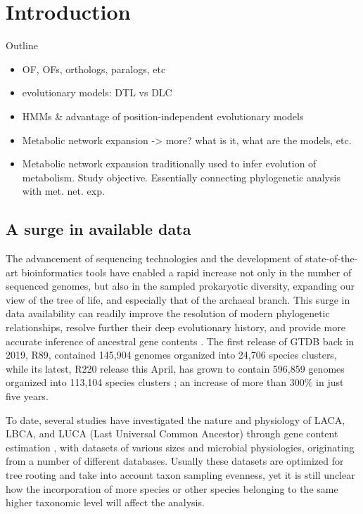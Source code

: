 \section{Introduction}
\normalsize
Outline
\begin{itemize}
    \item OF, OFs, orthologs, paralogs, etc
    \item evolutionary models: DTL vs DLC
    \item HMMs \& advantage of position-independent evolutionary models
    \item Metabolic network expansion -> more? what is it, what are the models, etc.
    \item Metabolic network expansion traditionally used to infer evolution of metabolism. Study objective. Essentially connecting phylogenetic analysis with met. net. exp.
\end{itemize}


\subsection*{A surge in available data}

The advancement of sequencing technologies and the development of state-of-the-art bioinformatics tools have enabled a rapid increase not only in the number of sequenced genomes, but also in the sampled prokaryotic diversity, expanding our view of the tree of life, and especially that of the archaeal branch. This surge in data availability can readily improve the resolution of modern phylogenetic relationships, resolve further their deep evolutionary history, and provide more accurate inference of ancestral gene contents \cite{tahon2021}. The first release of GTDB back in 2019, R89, contained 145,904 genomes organized into 24,706 species clusters, while its latest, R220 release this April, has grown to contain 596,859 genomes organized into 113,104 species clusters \cite{parks2018, parks2020, parks2022, rinke2021}; an increase of more than 300\% in just five years.

To date, several studies have investigated the nature and physiology of LACA, LBCA, and LUCA (Last Universal Common Ancestor) through gene content estimation \cite{williams2017, xavier2021, moody2024, coleman2021}, with datasets of various sizes and microbial physiologies, originating from a number of different databases. Usually these datasets are optimized for tree rooting and take into account taxon sampling evenness, yet it is still unclear how the incorporation of more species or other species belonging to the same higher taxonomic level will affect the analysis.
 
